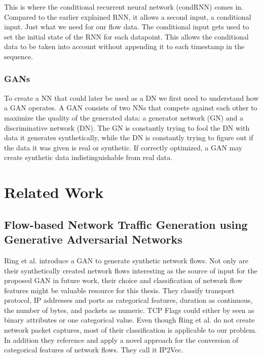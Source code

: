 \documentclass[
	ngerman,
	ruledheaders=section,%
	class=report,%
	thesis={type=bachelor},%
	accentcolor=9c,%
	custommargins=true,%
	marginpar=false,%
	parskip=half-,%
	fontsize=11pt,%
]{tudapub}
\begin{document}
This is where the conditional recurrent neural network (condRNN) comes in.
Compared to the earlier explained RNN, it allows a second input, a conditional input.
Just what we need for our flow data.
The conditional input gets used to set the initial state of the RNN for each datapoint.
This allows the conditional data to be taken into account without appending it to each timestamp in the sequence.

\subsection{GANs}

To create a NN that could later be used as a DN we first need to understand how a GAN operates.
A GAN consists of two NNs that compete against each other to maximize the quality of the generated data:
a generator network (GN) and a discriminative network (DN).
The GN is constantly trying to fool the DN with data it generates synthetically,
while the DN is constantly trying to figure out if the data it was given is real or synthetic.
If correctly optimized, a GAN may create synthetic data indistinguishable from real data.

\chapter{Related Work}

\section{Flow-based Network Traffic Generation using Generative Adversarial Networks}

Ring et al. \cite{ringFlowbasedNetworkTraffic2019a} introduce a GAN to generate synthetic network flows.
Not only are their synthetically created network flows interesting as the source of input for the proposed GAN in future work,
their choice and classification of network flow features might be valuable resource for this thesis.
They classify transport protocol, IP addresses and ports as categorical features, duration as continuous, the number of bytes, and packets as numeric.
TCP Flags could either by seen as binary attributes or one categorical value.
Even though Ring et al. \cite{ringFlowbasedNetworkTraffic2019a} do not create network packet captures, most of their classification is applicable to our problem.
In addition they reference and apply a novel approach for the conversion of categorical features of network flows.
They call it IP2Vec.
\end{document}
